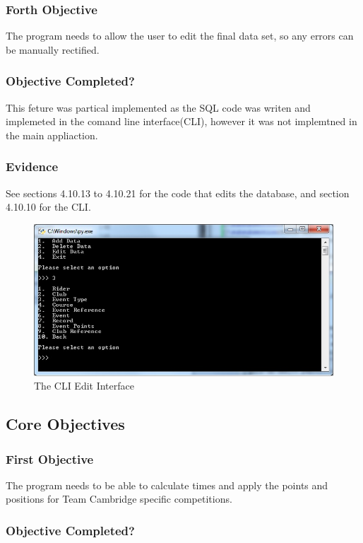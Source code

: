 \subsubsection{Forth Objective}
The program needs to allow the user to edit the final data set, so any errors can be manually rectified.
\subsubsection{Objective Completed?}
This feture was partical implemented as the SQL code was writen and implemeted in the comand line interface(CLI), however it was not implemtned in the main appliaction.
\subsubsection{Evidence}
See sections 4.10.13 to 4.10.21 for the code that edits the database, and section 4.10.10 for the CLI.

\begin{figure}[H]
    \includegraphics[width=\textwidth]{./Evaluation/CLI/CLI.jpg}
    \caption{The CLI Edit Interface} \label{fig:EditCLIEvid}
\end{figure}

\subsection{Core Objectives}
\subsubsection{First Objective}
The program needs to be able to calculate times and apply the points and positions for Team Cambridge specific competitions.
\subsubsection{Objective Completed?}

